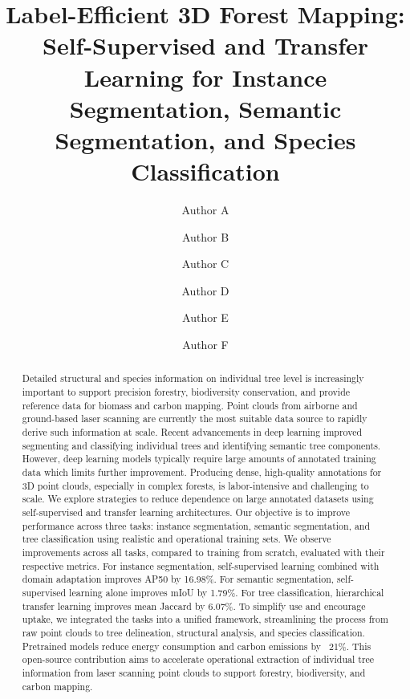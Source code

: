 \documentclass[review,authoryear]{elsarticle}
\begin{document}
\begin{frontmatter}

\title{Label-Efficient 3D Forest Mapping: Self-Supervised and Transfer Learning for Instance Segmentation, Semantic Segmentation, and Species Classification}

\author[1,2]{Author A}
\author[3]{Author B}
\author[1]{Author C}
\author[2]{Author D}
\author[1]{Author E}
\author[1,4]{Author F}


\address[1]{Example institute.}
\address[2]{Example institute.}
\address[3]{Example institute.}
\address[4]{Example institute.}



\begin{abstract}
Detailed structural and species information on individual tree level is increasingly important to support precision forestry, biodiversity conservation, and provide reference data for biomass and carbon mapping. Point clouds from airborne and ground-based laser scanning are currently the most suitable data source to rapidly derive such information at scale. Recent advancements in deep learning improved segmenting and classifying individual trees and identifying semantic tree components. However, deep learning models typically require large amounts of annotated training data which limits further improvement. Producing dense, high-quality annotations for 3D point clouds, especially in complex forests, is labor-intensive and challenging to scale. We explore strategies to reduce dependence on large annotated datasets using self-supervised and transfer learning architectures. Our objective is to improve performance across three tasks: instance segmentation, semantic segmentation, and tree classification using realistic and operational training sets. We observe improvements across all tasks, compared to training from scratch, evaluated with their respective metrics. For instance segmentation, self-supervised learning combined with domain adaptation improves AP50 by 16.98\%. For semantic segmentation, self-supervised learning alone improves mIoU by 1.79\%. For tree classification, hierarchical transfer learning improves mean Jaccard by 6.07\%. To simplify use and encourage uptake, we integrated the tasks into a unified framework, streamlining the process from raw point clouds to tree delineation, structural analysis, and species classification. Pretrained models reduce energy consumption and carbon emissions by ~21\%. This open-source contribution aims to accelerate operational extraction of individual tree information from laser scanning point clouds to support forestry, biodiversity, and carbon mapping. 
\end{abstract}


\end{frontmatter}
\end{document}
